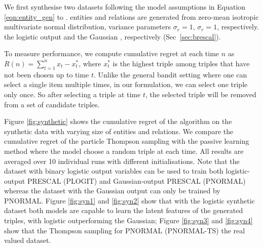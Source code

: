 We first synthesise two datasets 
following the model assumptions in Equation \ref{eqn:entity_gen} to 
\verify{\ref{eqn:triple_gen}}. 
entities and relations are generated from zero-mean isotropic multivariate normal distribution,  
variance parameters $\sigma_e=1$, $\sigma_r=1$, respectively.
 the logistic output and the Gaussian , respectively (Sec~\ref{sec:brescal}). 

To measure performance, we compute cumulative regret 
at each time $n$ as $R(n) = \sum_{t=1}^{n} x_t - x^{*}_t$, 
where $x^*_t$ is the highest triple among triples that have not been chosen up to time $t$. Unlike the general 
bandit setting where one can select a single item multiple times, in our formulation, we can select one triple 
only once. So after selecting a triple at time $t$, the selected triple will be removed from a set of candidate 
triples.

Figure \ref{fig:synthetic} shows the cumulative regret of the algorithm on the synthetic data with varying size of 
entities and relations. We compare the cumulative regret of the particle Thompson sampling with the passive 
learning method where the model choose a random triple at each time. All results are averaged over 10 
individual runs with different initialisations. 
Note that the dataset with binary logistic output variables can be used to train both logistic-output PRESCAL (PLOGIT) and Gaussian-output PRESCAL (PNORMAL) whereas the dataset with the Gaussian output can only be trained by PNORMAL.
Figure \ref{fig:syn1} and \ref{fig:syn2} show that with the logistic synthetic dataset both models are capable to learn the latent features of the generated triples, with logistic outperforming the Gaussian; Figure \ref{fig:syn3} and \ref{fig:syn4} show that the Thompson sampling for PNORMAL (PNORMAL-TS)  the real valued dataset. 

